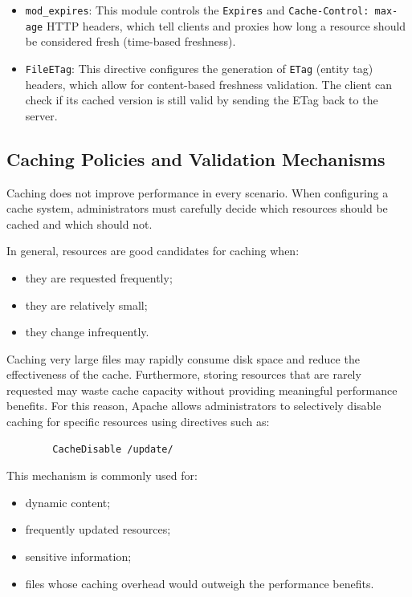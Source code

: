 \documentclass{scrbook}
\begin{document}
\begin{enumerate}
\begin{itemize}
	        \item
	        \texttt{mod\_expires}: This module controls the \texttt{Expires} and \texttt{Cache-Control: max-age} HTTP headers, which tell clients and proxies how long a resource should be considered fresh (time-based freshness).
	        
	        \item
	        \texttt{FileETag}: This directive configures the generation of \texttt{ETag} (entity tag) headers, which allow for content-based freshness validation. The client can check if its cached version is still valid by sending the ETag back to the server.
	    \end{itemize}
	\end{enumerate}
	
	\subsection{Caching Policies and Validation Mechanisms}
	
	Caching does not improve performance in every scenario. When configuring a cache system, administrators must carefully decide which resources should be cached and which should not.
	
	In general, resources are good candidates for caching when:
	\begin{itemize}
		\item
		they are requested frequently;
		
		\item
		they are relatively small;
		
		\item
		they change infrequently.
	\end{itemize}
	
	Caching very large files may rapidly consume disk space and reduce the effectiveness of the cache. Furthermore, storing resources that are rarely requested may waste cache capacity without providing meaningful performance benefits. For this reason, Apache allows administrators to selectively disable caching for specific resources using directives such as:
	
	\begin{lstlisting}
		CacheDisable /update/
	\end{lstlisting}
	
	This mechanism is commonly used for:
	\begin{itemize}
		\item
		dynamic content;
		
		\item
		frequently updated resources;
		
		\item
		sensitive information;
		
		\item
		files whose caching overhead would outweigh the performance benefits.
	\end{itemize}
	
\end{document}
